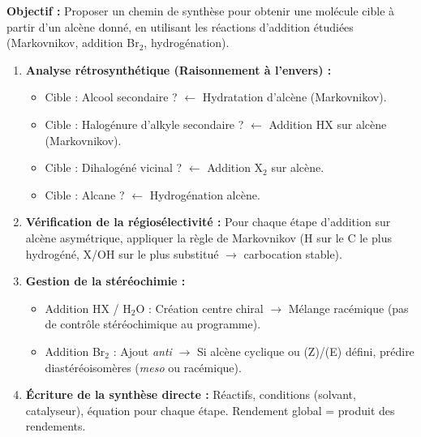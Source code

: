 \documentclass[11pt]{article}
\begin{document}
\begin{methode}
\textbf{Objectif :} Proposer un chemin de synthèse pour obtenir une molécule cible à partir d'un alcène donné, en utilisant les réactions d'addition étudiées (Markovnikov, addition Br$_2$, hydrogénation).

\begin{enumerate}
    \item \textbf{Analyse rétrosynthétique (Raisonnement à l'envers) :}
        \begin{itemize}
            \item Cible : Alcool secondaire ? $\leftarrow$ Hydratation d'alcène (Markovnikov). 
            \item Cible : Halogénure d'alkyle secondaire ? $\leftarrow$ Addition HX sur alcène (Markovnikov).
            \item Cible : Dihalogéné vicinal ? $\leftarrow$ Addition X$_2$ sur alcène.
            \item Cible : Alcane ? $\leftarrow$ Hydrogénation alcène.
        \end{itemize}
    \item \textbf{Vérification de la régiosélectivité :} Pour chaque étape d'addition sur alcène asymétrique, appliquer la règle de Markovnikov (H sur le C le plus hydrogéné, X/OH sur le plus substitué $\rightarrow$ carbocation stable).
    \item \textbf{Gestion de la stéréochimie :} 
        \begin{itemize}
            \item Addition HX / H$_2$O : Création centre chiral $\rightarrow$ Mélange racémique (pas de contrôle stéréochimique au programme).
            \item Addition Br$_2$ : Ajout \textit{anti} $\rightarrow$ Si alcène cyclique ou (Z)/(E) défini, prédire diastéréoisomères (\textit{meso} ou racémique).
        \end{itemize}
    \item \textbf{Écriture de la synthèse directe :} Réactifs, conditions (solvant, catalyseur), équation pour chaque étape. Rendement global = produit des rendements.
\end{enumerate}
\end{methode}
\end{document}
